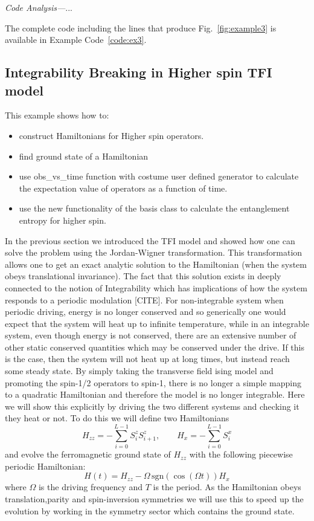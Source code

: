 \documentclass{SciPost}
\newcommand\0{\scalebox{-1}[1]{0}}
\newcommand{\JWcode}{example6.py}
\begin{document}
\noindent\emph{Code Analysis---}...


The complete code including the lines that produce Fig.~\ref{fig:example3} is available in Example Code~\ref{code:ex3}.



\subsection{Integrability Breaking in Higher spin TFI model}

This example shows how to:
\begin{itemize}
	\item construct Hamiltonians for Higher spin operators.
	\item find ground state of a Hamiltonian
	\item use obs\_vs\_time function with costume user defined generator to calculate the expectation value of operators as a function of time.
	\item use the new functionality of the basis class to calculate the entanglement entropy for higher spin.
\end{itemize}

 In the previous section we introduced the TFI model and showed how one can solve the problem using the Jordan-Wigner transformation. This transformation allows one to get an exact analytic solution to the Hamiltonian (when the system obeys translational invariance). The fact that this solution exists in deeply connected to the notion of Integrability which has implications of how the system responds to a periodic modulation [CITE]. For non-integrable system when periodic driving, energy is no longer conserved and so generically one would expect that the system will heat up to infinite temperature, while in an integrable system, even though energy is not conserved, there are an extensive number of other static conserved quantities which may be conserved under the drive. If this is the case, then the system will not heat up at long times, but instead reach some steady state. By simply taking the transverse field ising model and promoting the spin-1/2 operators to spin-1, there is no longer a simple mapping to a quadratic Hamiltonian and therefore the model is no longer integrable. Here we will show this explicitly by driving the two different systems and checking it they heat or not. To do this we will define two Hamiltonians
\begin{equation}
H_{zz} = -\sum_{i=0}^{L-1} S^z_iS^z_{i+1}, \qquad H_{x} = -\sum_{i=0}^{L-1}S^x_i
\end{equation}
and evolve the ferromagnetic ground state of $H_{zz}$ with the following piecewise periodic Hamiltonian:
\begin{equation}
H(t)=H_{zz} -\Omega\,\mathrm{sgn}\left(\cos(\Omega t)\right)H_x
\end{equation}
where $\Omega$ is the driving frequency and $T$ is the period. As the Hamiltonian obeys translation,parity and spin-inversion symmetries we will use this to speed up the evolution by working in the symmetry sector which contains the ground state. 
\end{document}
